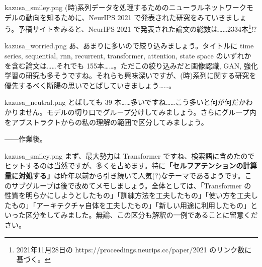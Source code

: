 \documentclass[b5paper,xelatex,ja=standard,10pt]{bxjsarticle}
\begin{document}
\begin{SERIFU}[colback=PaleIris, colbacktitle=PaleIris2]{kazusa_smiley.png}
(時)系列データを処理するためのニューラルネットワークモデルの動向を知るために、NeurIPS 2021 で発表された研究をみていきましょう。予稿サイトをみると、NeurIPS 2021 で発表された論文の総数は……2334本\footnote{2021年11月28日の https://proceedings.neurips.cc/paper/2021 のリンク数に基づく。}!?
\end{SERIFU}

\begin{SERIFU}[colback=PaleIris, colbacktitle=PaleIris2]{kazusa_worried.png}
あ、あまりに多いので絞り込みましょう。タイトルに time series, sequential, rnn, recurrent, transformer, attention, state space のいずれかを含む論文は……それでも 155本……。ただこの絞り込みだと画像認識, GAN, 強化学習の研究も多そうですね。それらも興味深いですが、(時)系列に関する研究を優先するべく断腸の思いでとばしていきましょう……。
\end{SERIFU}

\begin{SERIFU}[colback=PaleIris, colbacktitle=PaleIris2]{kazusa_neutral.png}
とばしても 39 本……多いですね……こう多いと何が何だかわかりません。モデルの切り口でグループ分けしてみましょう。さらにグループ内をアブストラクトからの私の理解の範囲で区分してみましょう。
\end{SERIFU}
\vspace{1pt}
\centerline{――作業後。}

\begin{SERIFU}[colback=PaleIris, colbacktitle=PaleIris2]{kazusa_smiley.png}
まず、最大勢力は Transformer ですね、検索語に含めたのでヒットするのは当然ですが、多くを占めます。特に\textbf{「セルフアテンションの計算量に対処する」}は昨年以前から引き続いて人気(?)なテーマであるようです。このサブグループは後で改めてメモしましょう。全体としては、「Transformer の性質を明らかにしようとしたもの」「訓練方法を工夫したもの」「使い方を工夫したもの」「アーキテクチャ自体を工夫したもの」「新しい用途に利用したもの」といった区分をしてみました。無論、この区分も解釈の一例であることに留意ください。
\end{SERIFU}
\end{document}
